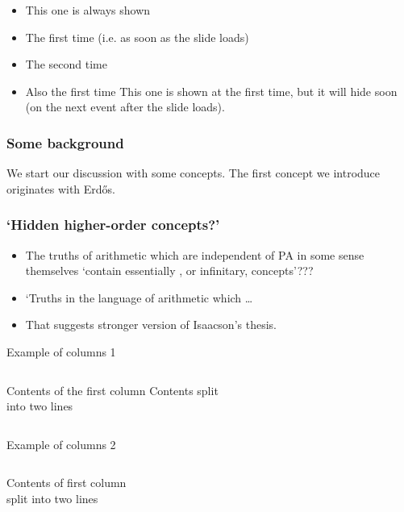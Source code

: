 \documentclass[aspectratio=1610]{beamer}
\begin{document}
\begin{frame}
\begin{itemize}
    \item This one is always shown
    \item<1-> The first time (i.e. as soon as the slide loads)
    \item<2-> The second time
    \item<1-> Also the first time
     {This one is shown at the first time, but it will hide soon (on the next event after the slide loads).}
  \end{itemize}
\end{frame}

\begin{frame}
  \frametitle{Some background}
  We start our discussion with some concepts.
  \pause
  The first concept we introduce originates with Erd\H os.
\end{frame}

\begin{frame}
  \frametitle{`Hidden higher-order concepts?'}
  \begin{itemize}[<+->]
  \item The truths of arithmetic which are independent of PA in some 
  sense themselves `{contain} essentially {\color{blue}{hidden higher-order}},
   or infinitary, concepts'???
  \item `Truths in the language of arithmetic which \ldots
  \item That suggests stronger version of Isaacson's thesis. 
  \end{itemize}
\end{frame}

\begin{frame}{Example of columns 1}
    \begin{columns}[c] %
     Contents of the first column
     Contents split \\ into two lines
    \end{columns}
\end{frame}
 
\begin{frame}{Example of columns 2}
     \begin{columns}[T] %
     \begin{column}[T]{5cm} %
     Contents of first column \\ split into two lines
     \end{column}
     \begin{column}[T]{5cm} %
     \end{column}
     \end{columns}
\end{frame}
\end{document}
